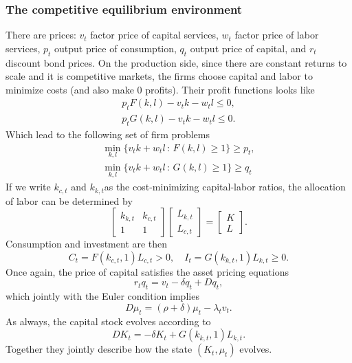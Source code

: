 \documentclass[11pt,english]{article}
\begin{document}
\subsubsection{The competitive equilibrium environment}
There are prices: $v_t$ factor price of capital services, $w_t$ factor price of labor services, $p_t$ output price of consumption, $q_t$ output price of capital, and $r_t$ discount bond prices. On the production side, since there are constant returns to scale and it is competitive markets, the firms choose capital and labor to minimize costs (and also make 0 profits). Their profit functions looks like
\begin{align*}
p_tF(k,l) - v_t k - w_t l\leq 0,\\
p_tG(k,l) - v_t k - w_t l\leq 0.
\end{align*} Which lead to the following set of firm problems
\begin{align*}
\min_{k,l}\{v_t k + w_tl\,:\,F(k,l) \geq 1\} \geq p_t,\\
\min_{k,l}\{v_t k + w_tl\,:\,G(k,l) \geq 1\} \geq q_t
\end{align*}
If we write $k_{c,t}$ and $k_{k,t}$as the cost-minimizing capital-labor ratios, the allocation of labor can be determined by $$\begin{bmatrix} k_{k, t} & k_{c,t} \\ 1 & 1 \end{bmatrix} \begin{bmatrix} L_{k,t} \\ L_{c,t} \end{bmatrix} = \begin{bmatrix} K\\ L \end{bmatrix}.$$ Consumption and investment are then $$C_t = F(k_{c,t}, 1)L_{c,t} > 0,\quad I_t = G(k_{k,t}, 1)L_{k,t} \geq 0.$$ Once again, the price of capital satisfies the asset pricing equations $$r_t q_t = v_t - \delta q_t + Dq_t,$$which jointly with the Euler condition implies $$D\mu_t = (\rho + \delta)\mu_t - \lambda_tv_t.$$As always, the capital stock evolves according to $$DK_t = -\delta K_t + G(k_{k,t}, 1)L_{k, t}.$$ Together they jointly describe how the state $(K_t, \mu_t)$ evolves.
\end{document}
